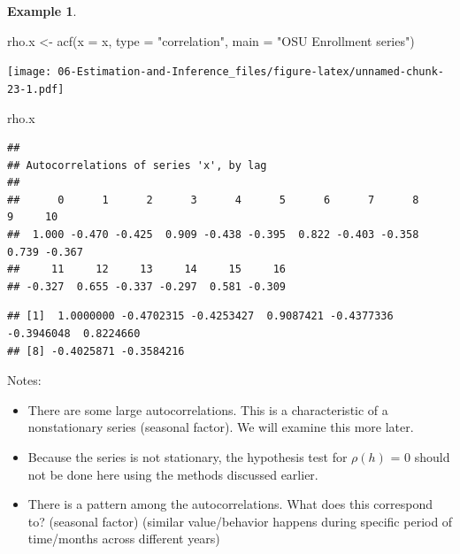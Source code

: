 \documentclass[
]{book}
\newenvironment{Shaded}{\begin{snugshade}}{\end{snugshade}}
\newcommand{\AttributeTok}[1]{\textcolor[rgb]{0.77,0.63,0.00}{#1}}
\newcommand{\DecValTok}[1]{\textcolor[rgb]{0.00,0.00,0.81}{#1}}
\newcommand{\FunctionTok}[1]{\textcolor[rgb]{0.00,0.00,0.00}{#1}}
\newcommand{\NormalTok}[1]{#1}
\newcommand{\OtherTok}[1]{\textcolor[rgb]{0.56,0.35,0.01}{#1}}
\newcommand{\SpecialCharTok}[1]{\textcolor[rgb]{0.00,0.00,0.00}{#1}}
\newcommand{\StringTok}[1]{\textcolor[rgb]{0.31,0.60,0.02}{#1}}
\providecommand{\tightlist}{%
  \setlength{\itemsep}{0pt}\setlength{\parskip}{0pt}}
\theoremstyle{definition}
\theoremstyle{definition}
\newtheorem{example}{Example}[chapter]
\theoremstyle{definition}
\theoremstyle{definition}
\theoremstyle{remark}
\begin{document}
\begin{example}
\begin{Shaded}
\begin{Highlighting}[]
\NormalTok{  rho.x }\OtherTok{\textless{}{-}} \FunctionTok{acf}\NormalTok{(}\AttributeTok{x =}\NormalTok{ x, }\AttributeTok{type =} \StringTok{"correlation"}\NormalTok{, }\AttributeTok{main =} \StringTok{"OSU Enrollment series"}\NormalTok{)}
\end{Highlighting}
\end{Shaded}

\texttt{[image: 06-Estimation-and-Inference\_files/figure-latex/unnamed-chunk-23-1.pdf]}

\begin{Shaded}
\begin{Highlighting}[]
\NormalTok{  rho.x}
\end{Highlighting}
\end{Shaded}

\begin{verbatim}
## 
## Autocorrelations of series 'x', by lag
## 
##      0      1      2      3      4      5      6      7      8      9     10 
##  1.000 -0.470 -0.425  0.909 -0.438 -0.395  0.822 -0.403 -0.358  0.739 -0.367 
##     11     12     13     14     15     16 
## -0.327  0.655 -0.337 -0.297  0.581 -0.309
\end{verbatim}

\begin{Shaded}
\end{Shaded}

\begin{verbatim}
## [1]  1.0000000 -0.4702315 -0.4253427  0.9087421 -0.4377336 -0.3946048  0.8224660
## [8] -0.4025871 -0.3584216
\end{verbatim}

\end{example}

Notes:

\begin{itemize}
\tightlist
\item
  There are some large autocorrelations. This is a characteristic of a nonstationary series (seasonal factor). We will examine this more later.
\item
  Because the series is not stationary, the hypothesis test for \(\rho(h)\) = 0 should not be done here using the methods discussed earlier.\\
\item
  There is a pattern among the autocorrelations. What does this correspond to? (seasonal factor) (similar value/behavior happens during specific period of time/months across different years)
\end{itemize}
\end{document}
